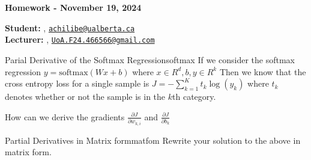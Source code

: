 





\begin{Large}
    \textsf{\textbf{Homework - November 19, 2024}}
\end{Large}

\vspace{1ex}

\textsf{\textbf{Student:}} , \href{mailto:achilibe@ualberta.ca}{\texttt{achilibe@ualberta.ca}}\\
\textsf{\textbf{Lecturer:}} , \href{mailto:UoA.F24.466566@gmail.com}{\texttt{UoA.F24.466566@gmail.com}}


\vspace{2ex}


\begin{problem}{Parial Derivative of the Softmax Regression}{softmax}
  If we consider the softmax regression $y = \text{softmax}( Wx + b )$ where $x\in R^d, b, y \in R^k$ Then we know that the cross entropy loss for a single sample is $J = - \sum^K_{k=1} t_k\log (y_k)$ where $t_k$ denotes whether or not the sample is in the $k$th category. 

How can we derive the gradients $\frac{\partial J}{\partial w_{k, i}}$ and $\frac{\partial J}{\partial b_k}$
\end{problem}



\begin{problem}{Partial Derivatives in Matrix form}{matfom}
  Rewrite your solution to the above in matrix form.
\end{problem}










